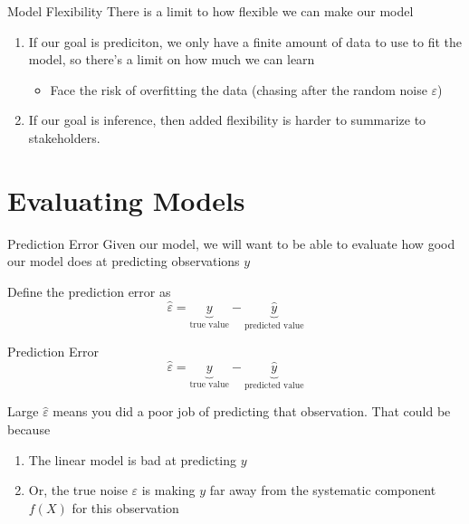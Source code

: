 \documentclass[aspectratio=169,t,11pt,table]{beamer}
\begin{document}
\begin{frame}{Model Flexibility}
  There is a limit to how \alert{flexible} we can make our model
 
  \bigskip
  \begin{enumerate}
    \item If our goal is prediciton, we only have a finite amount of data to use to fit the model, so there's a limit on how much we can learn
    \begin{itemize}
      \item Face the risk of \alert{overfitting} the data (chasing after the random noise $\varepsilon$)
    \end{itemize}
   
   \item If our goal is inference, then added flexibility is harder to summarize to stakeholders.
  \end{enumerate}
\end{frame}



\section{Evaluating Models}

\begin{frame}{Prediction Error}
  Given our model, we will want to be able to evaluate how good our model does at predicting observations $y$

  \bigskip
  Define the \alert{prediction error} as 
  $$
    \hat{\varepsilon} = \underbrace{y}_{\text{true value}} - \underbrace{\hat{y}}_{\text{predicted value}}
  $$

\end{frame}

\begin{frame}{Prediction Error}
  $$
    \hat{\varepsilon} = \underbrace{y}_{\text{true value}} - \underbrace{\hat{y}}_{\text{predicted value}}
  $$

  \bigskip
  Large $\hat{\varepsilon}$ means you did a poor job of predicting that observation. That could be because
  \begin{enumerate}
    \item The linear model is bad at predicting $y$
    \item Or, the true noise $\varepsilon$ is making $y$ far away from the systematic component $f(X)$ for this observation
  \end{enumerate}
\end{frame}
\end{document}
